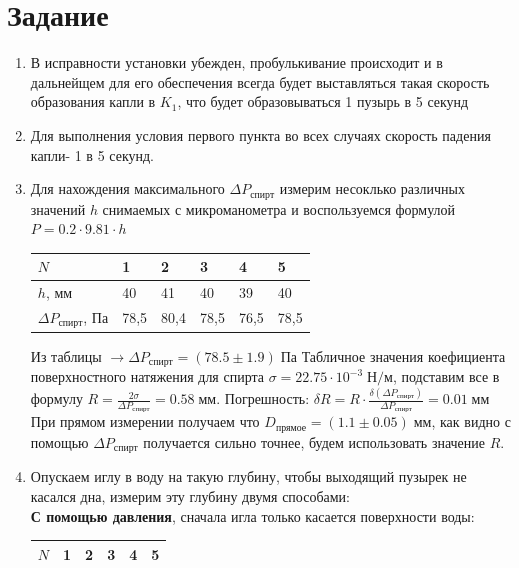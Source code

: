 \documentclass[12 pt, a4paper]{article}%
\begin{document}
\section*{Задание}
\begin{enumerate}
    \item В исправности установки убежден, пробулькивание происходит и в дальнейщем для его обеспечения всегда будет выставляться такая скорость образования капли в $K_1$, что будет образовываться 1 пузырь в 5 секунд
    \item Для выполнения условия первого пункта во всех случаях скорость падения капли- 1 в 5 секунд.
    \item Для нахождения максимального $\Delta P_{спирт}$ измерим несоклько различных значений $h$ снимаемых с микроманометра и воспользуемся формулой $P = 0.2 \cdot 9.81 \cdot h$
    \begin{center}
    \begin{tabular}{|l|l|l|l|l|l|}
    \hline
    $N$                    & 1    & 2    & 3    & 4    & 5    \\ \hline
    $h$, мм                & 40   & 41   & 40   & 39   & 40   \\ \hline
    $\Delta P_{спирт}$, Па & 78,5 & 80,4 & 78,5 & 76,5 & 78,5 \\ \hline
    \end{tabular}
    \end{center}
    Из таблицы $\rightarrow \Delta P_{спирт}= (78.5 \pm 1.9) \;Па$ \newpage
    Табличное значения коефициента поверхностного натяжения для спирта $\sigma = 22.75\cdot10^{-3}\; Н/м$, подставим все в формулу $R = \frac{2\sigma}{\Delta P_{спирт}} = 0.58\; мм$. Погрешность: $\delta R = R \cdot \frac{\delta(\Delta P_{спирт})}{\Delta P_{спирт}} = 0.01\; мм$\\
    При прямом измерении получаем что $D_{прямое} = (1.1 \pm 0.05)\; мм$, как видно с помощью $\Delta P_{спирт}$ получается сильно точнее, будем использовать значение $R$.
    \item Опускаем иглу в воду на такую глубину, чтобы выходящий пузырек не касался дна, измерим эту глубину двумя способами: \\
    \textbf{С помощью давления}, сначала игла только касается поверхности воды:
    \begin{center}
    \begin{tabular}{|l|r|r|r|r|r|}
    \hline
    $N$       & \multicolumn{1}{l|}{1} & \multicolumn{1}{l|}{2} & \multicolumn{1}{l|}{3} & \multicolumn{1}{l|}{4} & \multicolumn{1}{l|}{5} \\ \hline

\end{tabular}
\end{center}
\end{enumerate}
\end{document}
